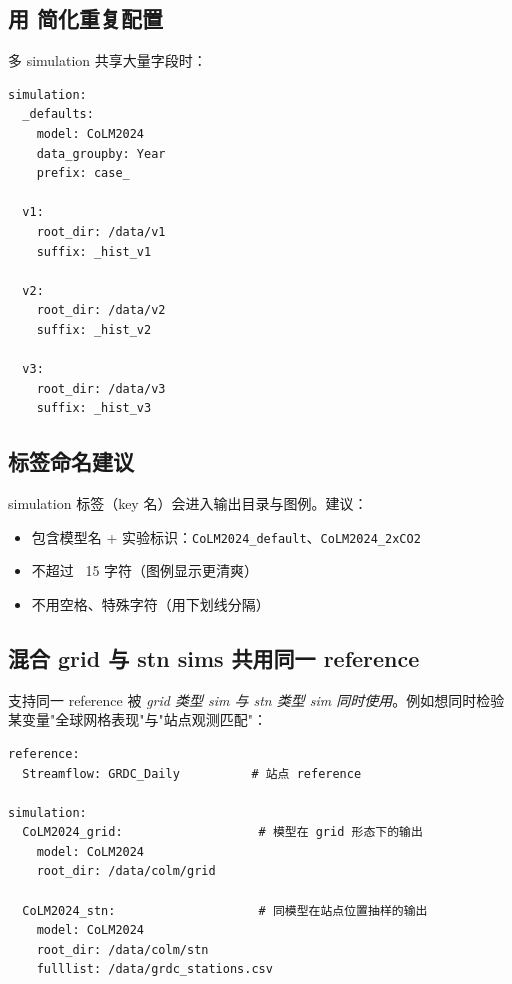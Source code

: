 \subsection{用  简化重复配置}

多 simulation 共享大量字段时：

\begin{verbatim}
simulation:
  _defaults:
    model: CoLM2024
    data_groupby: Year
    prefix: case_

  v1:
    root_dir: /data/v1
    suffix: _hist_v1

  v2:
    root_dir: /data/v2
    suffix: _hist_v2

  v3:
    root_dir: /data/v3
    suffix: _hist_v3
\end{verbatim}

\subsection{标签命名建议}

simulation 标签（key 名）会进入输出目录与图例。建议：

\begin{itemize}
  \item 包含模型名 + 实验标识：\texttt{CoLM2024\_default}、\texttt{CoLM2024\_2xCO2}
  \item 不超过 ~15 字符（图例显示更清爽）
  \item 不用空格、特殊字符（用下划线分隔）
\end{itemize}

\subsection{混合 grid 与 stn sims 共用同一 reference}

\openbench{} 支持同一 reference 被 \emph{grid 类型 sim 与 stn 类型 sim 同时使用}。例如想同时检验某变量"全球网格表现"与"站点观测匹配"：

\begin{verbatim}
reference:
  Streamflow: GRDC_Daily          # 站点 reference

simulation:
  CoLM2024_grid:                   # 模型在 grid 形态下的输出
    model: CoLM2024
    root_dir: /data/colm/grid

  CoLM2024_stn:                    # 同模型在站点位置抽样的输出
    model: CoLM2024
    root_dir: /data/colm/stn
    fulllist: /data/grdc_stations.csv
\end{verbatim}

